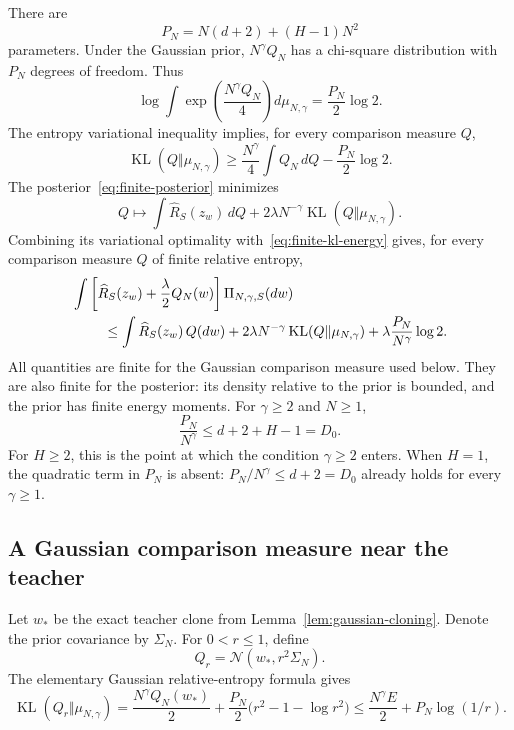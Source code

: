There are
\[
 P_N=N(d+2)+(H-1)N^2
\]
parameters.  Under the Gaussian prior, $N^\gamma Q_N$ has a
chi-square distribution with $P_N$ degrees of freedom.  Thus
\[
 \log\int\exp\left(\frac{N^\gamma Q_N}4\right)d\mu_{N,\gamma}
       =\frac{P_N}2\log2.
\]
The entropy variational inequality implies, for every comparison
measure $Q$,
\begin{equation}
 \operatorname{KL}(Q\Vert\mu_{N,\gamma})
   \geq\frac{N^\gamma}4\int Q_N\,dQ-\frac{P_N}2\log2.
 \label{eq:finite-kl-energy}
\end{equation}
The posterior~\eqref{eq:finite-posterior} minimizes
\[
 Q\longmapsto\int\widehat R_S(z_w)\,dQ
                   +2\lambda N^{-\gamma}
                          \operatorname{KL}(Q\Vert\mu_{N,\gamma}).
\]
Combining its variational optimality with~\eqref{eq:finite-kl-energy}
gives, for every comparison measure $Q$ of finite relative entropy,
\begin{align}
 &\int\left[\widehat R_S(z_w)+\frac\lambda2 Q_N(w)\right]
                          \Pi_{N,\gamma,S}(dw)\notag\\
 &\hspace{8mm}\leq
      \int\widehat R_S(z_w)\,Q(dw)
       +2\lambda N^{-\gamma}\operatorname{KL}(Q\Vert\mu_{N,\gamma})
       +\lambda\frac{P_N}{N^\gamma}\log2.
 \label{eq:finite-variational-comparison}
\end{align}
All quantities are finite for the Gaussian comparison measure used
below.  They are also finite for the posterior: its density relative
to the prior is bounded, and the prior has finite energy moments.
For $\gamma\geq2$ and $N\geq1$,
\begin{equation}
 \frac{P_N}{N^\gamma}\leq d+2+H-1=D_0.
 \label{eq:finite-dimension-ratio}
\end{equation}
For $H\geq2$, this is the point at which the condition
$\gamma\geq2$ enters.  When $H=1$, the quadratic term in $P_N$ is
absent: $P_N/N^\gamma\leq d+2=D_0$ already holds for every
$\gamma\geq1$.

\subsection{A Gaussian comparison measure near the teacher}

Let $w_*$ be the exact teacher clone from
Lemma~\ref{lem:gaussian-cloning}.  Denote the prior covariance by
$\Sigma_N$.  For $0<r\leq1$, define
\[
 Q_r=\mathcal N(w_*,r^2\Sigma_N).
\]
The elementary Gaussian relative-entropy formula gives
\begin{equation}
 \operatorname{KL}(Q_r\Vert\mu_{N,\gamma})
  =\frac{N^\gamma Q_N(w_*)}2
       +\frac{P_N}2\bigl(r^2-1-\log r^2\bigr)
  \leq\frac{N^\gamma E}2+P_N\log(1/r).
 \label{eq:finite-comparison-kl}
\end{equation}

